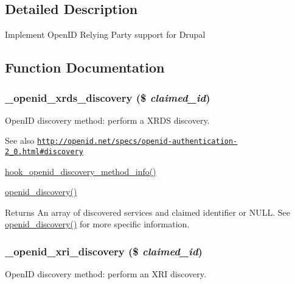 \subsection{Detailed Description}
Implement OpenID Relying Party support for Drupal 

\subsection{Function Documentation}
\hypertarget{openid_8module_a90d1aa7f4e4f3778d16564d1db5ecf14}{
\subsubsection[{\_\-openid\_\-xrds\_\-discovery}]{\setlength{\rightskip}{0pt plus 5cm}\_\-openid\_\-xrds\_\-discovery (\$ {\em claimed\_\-id})}}
\label{openid_8module_a90d1aa7f4e4f3778d16564d1db5ecf14}
OpenID discovery method: perform a XRDS discovery.

\begin{DoxySeeAlso}{See also}
\href{http://openid.net/specs/openid-authentication-2_0.html#discovery}{\tt http://openid.net/specs/openid-\/authentication-\/2\_\-0.html\#discovery} 

\hyperlink{group__hooks_gaec6cbfdd913d8ba670c991b87bbf9676}{hook\_\-openid\_\-discovery\_\-method\_\-info()} 

\hyperlink{openid_8module_ae52417e5179c251a3256583ea3e67d30}{openid\_\-discovery()}
\end{DoxySeeAlso}
\begin{DoxyReturn}{Returns}
An array of discovered services and claimed identifier or NULL. See \hyperlink{openid_8module_ae52417e5179c251a3256583ea3e67d30}{openid\_\-discovery()} for more specific information. 
\end{DoxyReturn}
\hypertarget{openid_8module_a8fe2a535999c4dbbea783966cf26443f}{
\subsubsection[{\_\-openid\_\-xri\_\-discovery}]{\setlength{\rightskip}{0pt plus 5cm}\_\-openid\_\-xri\_\-discovery (\$ {\em claimed\_\-id})}}
\label{openid_8module_a8fe2a535999c4dbbea783966cf26443f}
OpenID discovery method: perform an XRI discovery.

